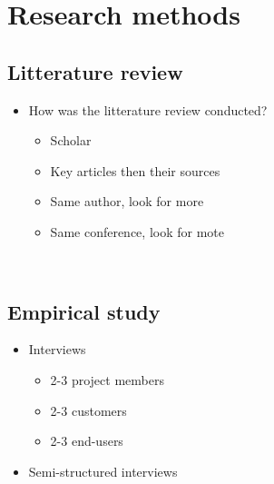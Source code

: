 
\chapter{Research methods}
\label{chapter:mehods}

\section{Litterature review}
\label{section:litterature}

\begin{itemize}
  \item{How was the litterature review conducted?}
  \begin{itemize}
    \item{Scholar}
    \item{Key articles then their sources}
    \item{Same author, look for more}
    \item{Same conference, look for mote}
  \end{itemize}
  \
\end{itemize}

\section{Empirical study}
\label{section:empirical}

\begin{itemize}
  \item{Interviews}
  \begin{itemize}
    \item{2-3 project members}
    \item{2-3 customers}
    \item{2-3 end-users}
  \end{itemize}
  \item{Semi-structured interviews}
\end{itemize}

